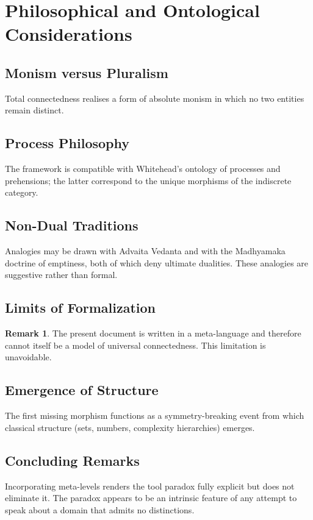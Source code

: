 \documentclass[11pt,a4paper]{article}
\theoremstyle{definition}
\newtheorem{remark}[theorem]{Remark}
\begin{document}
\section{Philosophical and Ontological Considerations}
\subsection{Monism versus Pluralism}
Total connectedness realises a form of absolute monism in which no two entities remain distinct.

\subsection{Process Philosophy}
The framework is compatible with Whitehead’s ontology of processes and prehensions; the latter correspond to the unique morphisms of the indiscrete category.

\subsection{Non-Dual Traditions}
Analogies may be drawn with Advaita Vedanta and with the Madhyamaka doctrine of emptiness, both of which deny ultimate dualities. These analogies are suggestive rather than formal.

\subsection{Limits of Formalization}
\begin{remark}
The present document is written in a meta-language and therefore cannot itself be a model of universal connectedness. This limitation is unavoidable.
\end{remark}

\subsection{Emergence of Structure}
The first missing morphism functions as a symmetry-breaking event from which classical structure (sets, numbers, complexity hierarchies) emerges.

\subsection{Concluding Remarks}
Incorporating meta-levels renders the tool paradox fully explicit but does not eliminate it. The paradox appears to be an intrinsic feature of any attempt to speak about a domain that admits no distinctions.
\end{document}
